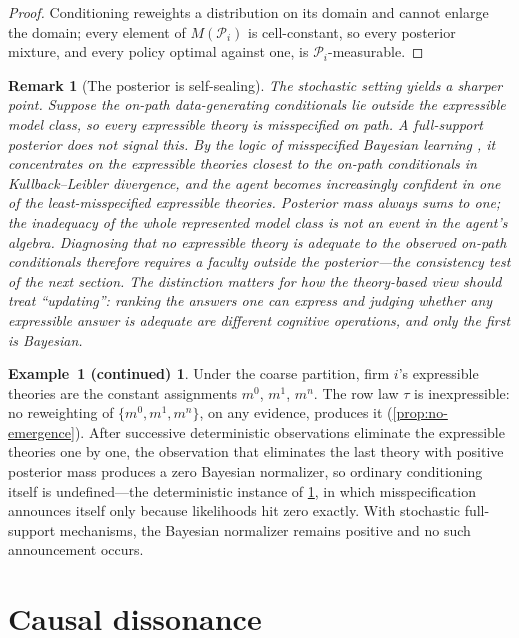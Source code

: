 \documentclass[11pt]{article}
\newtheorem{remark}[assumption]{Remark}
\theoremstyle{definition}
\newtheorem*{excont}{Example~1 (continued)}
\begin{document}
\begin{proof}
Conditioning reweights a distribution on its domain and cannot enlarge the domain; every element of $M(\mathcal P_i)$ is cell-constant, so every posterior mixture, and every policy optimal against one, is $\mathcal P_i$-measurable.
\end{proof}

\begin{remark}[The posterior is self-sealing]
\label{rem:self-sealing}
The stochastic setting yields a sharper point.
Suppose the on-path data-generating conditionals lie outside the expressible model class, so every expressible theory is misspecified on path.
A full-support posterior does not signal this.
By the logic of misspecified Bayesian learning \citep{Berk1966}, it concentrates on the expressible theories closest to the on-path conditionals in Kullback--Leibler divergence, and the agent becomes increasingly \emph{confident} in one of the least-misspecified expressible theories.
Posterior mass always sums to one; the inadequacy of the whole represented model class is not an event in the agent's algebra.
Diagnosing that no expressible theory is adequate to the observed on-path conditionals therefore requires a faculty outside the posterior---the consistency test of the next section.
The distinction matters for how the theory-based view should treat ``updating'': ranking the answers one can express and judging whether any expressible answer is adequate are different cognitive operations, and only the first is Bayesian.
\end{remark}

\begin{excont}
Under the coarse partition, firm $i$'s expressible theories are the constant assignments $m^0$, $m^1$, $m^n$.
The row law $\tau$ is inexpressible: no reweighting of $\{m^0,m^1,m^n\}$, on any evidence, produces it (\cref{prop:no-emergence}).
After successive deterministic observations eliminate the expressible theories one by one, the observation that eliminates the last theory with positive posterior mass produces a zero Bayesian normalizer, so ordinary conditioning itself is undefined---the deterministic instance of \cref{rem:self-sealing}, in which misspecification announces itself only because likelihoods hit zero exactly.
With stochastic full-support mechanisms, the Bayesian normalizer remains positive and no such announcement occurs.
\end{excont}
\section{Causal dissonance}
\label{sec:dissonance}
\end{document}
